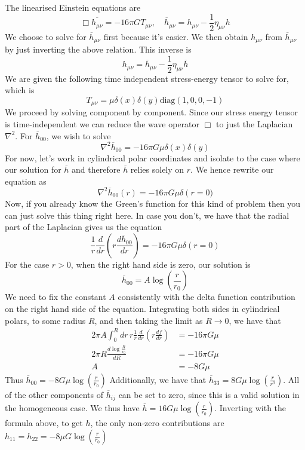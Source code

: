 The linearised Einstein equations are 
\[
 \Box \overline{h _{ \mu \nu } }  = - 16 \pi G T_{ \mu \nu } , \quad 
 \overline{h } _{ \mu \nu }  = h _{ \mu \nu }   - \frac{1}{2 } \eta _{ \mu \nu } h 
\] We choose to solve for $ \overline{ h } _{\mu \nu } $ 
first because it's easier. We then obtain $ h _{ \mu \nu } $ from 
$ \overline{ h } _{ \mu \nu }  $  by just inverting the above relation. 
This inverse is 
\[
 h _{ \mu \nu }  = \overline{ h } _{ \mu \nu } - \frac{1}{2 } \eta _{ \mu \nu } \overline{h } 
\] We are given the following time independent 
stress-energy tensor to solve for, which is 
\[
	T _{ \mu \nu }  = \mu \delta \left( x  \right)  \delta \left( y  \right)  
	\text{diag}\left( 1, 0 , 0 , - 1  \right)  
\] We proceed by solving component by component. 
Since our stress energy tensor is time-independent we 
can reduce the wave operator $ \Box $ to just the Laplacian 
$ \nabla ^ 2 $. For $ \overline{ h } _{ 00 } $, we wish to solve 
\[
	\nabla ^ 2 \overline{ h } _{ 00 }   = - 16 \pi G \mu \delta \left( x  \right)\delta\left( y \right) 
\] For now, let's work in cylindrical polar 
coordinates and isolate to the case where 
our solution for $ \overline{ h } $ and therefore 
$ \overline{ h }  $ relies solely on $ r $. 
We hence rewrite our equation as 
\[
	\nabla ^ 2 \overline{ h } _{ 00 }\left( r  \right)  = - 16 \pi G \mu \delta\left(r = 0)  
\] Now, if you already know the 
Green's function for this kind of problem then 
you can just solve this thing right here. 
In case you don't, we have that the radial part of the Laplacian 
gives us the equation 
\[
	\frac{1}{r } \frac{d }{ dr } \left( r \frac{ d \overline{ h } _{ 0 0 } }{ d r } 		   \right) = - 16 \pi G \mu \delta \left(  r  =  0  \right)  
\]  For the case $ r > 0 $, when the 
right hand side is zero, our solution is 
\[
	\overline{ h }_{ 0 0 }  = A \log \left( \frac{r}{ r_0} \right) 
\] We need 
to fix the constant  $ A $ consistently with the 
delta function contribution on the 
right hand side of the equation. 
Integrating both sides in cylindrical polars, to 
some radius  $ R $, and then taking the limit as  $ R  \to 0 $, 
we have that 
\begin{align*}
	2 \pi A \int _{ 0 } ^ R dr \, r \frac{1}{r } \frac{ d  }{ dr } 
	\left( r \frac{ df }{ dr}  \right) &  =  - 16 \pi G \mu \\
	2 \pi R \frac{ d \log \frac{ R }{ r_ 0} }{ d R }  & =  - 16 \pi G \mu \\
	A & = - 8 G \mu 
\end{align*}
Thus $ \overline{h } _{ 00 }  = - 8 G \mu \log \left( \frac{ r }{ r _ 0 }  \right) $ 
Additionally, we have that $ \overline{ h } _{ 33 }  = 8 G \mu \log \left( \frac{ r }{ r^0 } \right) $. All of the other components of $ \overline{ h} _{ ij } $  
can be set to zero, since this is a valid solution 
in the homogeneous case. We thus have $ \overline{ h }  = 16 G \mu 
\log \left( \frac{r}{ r_0 }  \right) $. Inverting with the formula above, 
to get $ h $, the only non-zero contributions are
$ h_{ 11 }  = h _{ 22 }  =  -  8 \mu G \log \left( \frac{r}{ r_0 } \right) $


